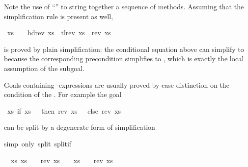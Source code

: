 \begin{isabellebody}
%
\begin{isamarkuptext}%
\noindent
Note the use of ``'' to string together a
sequence of methods. Assuming that the simplification rule
is present as well,%
\end{isamarkuptext}%
\ {\isachardoublequote}xs\ {\isasymnoteq}\ {\isacharbrackleft}{\isacharbrackright}\ {\isasymLongrightarrow}\ hd{\isacharparenleft}rev\ xs{\isacharparenright}\ {\isacharhash}\ tl{\isacharparenleft}rev\ xs{\isacharparenright}\ {\isacharequal}\ rev\ xs{\isachardoublequote}%
\begin{isamarkuptext}%
\noindent
is proved by plain simplification:
the conditional equation  above
can simplify  to 
because the corresponding precondition 
simplifies to , which is exactly the local
assumption of the subgoal.%
\end{isamarkuptext}%
%
%
\begin{isamarkuptext}%
Goals containing -expressions are usually proved by case
distinction on the condition of the . For example the goal%
\end{isamarkuptext}%
\ {\isachardoublequote}{\isasymforall}xs{\isachardot}\ if\ xs\ {\isacharequal}\ {\isacharbrackleft}{\isacharbrackright}\ then\ rev\ xs\ {\isacharequal}\ {\isacharbrackleft}{\isacharbrackright}\ else\ rev\ xs\ {\isasymnoteq}\ {\isacharbrackleft}{\isacharbrackright}{\isachardoublequote}%
\begin{isamarkuptxt}%
\noindent
can be split by a degenerate form of simplification%
\end{isamarkuptxt}%
simp\ only{\isacharcolon}\ split{\isacharcolon}\ split{\isacharunderscore}if{\isacharparenright}%
\begin{isamarkuptxt}%
\noindent
\begin{isabelle}%
\ {}{\isachardot}\ {\isasymforall}xs{\isachardot}\ {\isacharparenleft}xs\ {\isacharequal}\ {\isacharbrackleft}{\isacharbrackright}\ {\isasymlongrightarrow}\ rev\ xs\ {\isacharequal}\ {\isacharbrackleft}{\isacharbrackright}{\isacharparenright}\ {\isasymand}\ {\isacharparenleft}xs\ {\isasymnoteq}\ {\isacharbrackleft}{\isacharbrackright}\ {\isasymlongrightarrow}\ rev\ xs\ {\isasymnoteq}\ {\isacharbrackleft}{\isacharbrackright}{\isacharparenright}%

\end{isabelle}
\end{isamarkuptxt}
\end{isabellebody}
